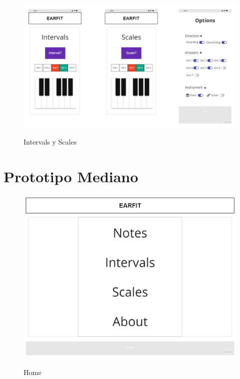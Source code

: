 \documentclass[12pt,twoside,titlepage]{report}
\begin{document}
\begin{figure}[H]
    \centering
    \includegraphics[scale=0.3]{Design Thinking/Prototipo/Small/Prototipo2}
    \label{fig:Prototipo2}
    \caption{Intervals y Scales}
\end{figure}

\section{Prototipo Mediano}

\begin{figure}[H]
    \centering
    \includegraphics[scale=0.3]{Design Thinking/Prototipo/Medium/Menu}
    \label{fig:Menu}
    \caption{Home}
\end{figure}
\end{document}
